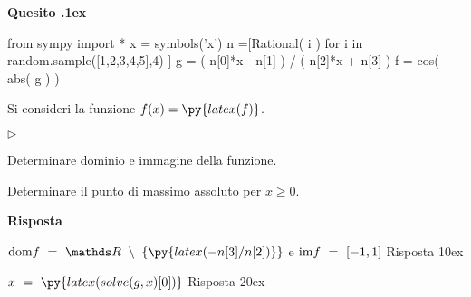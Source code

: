\documentclass[11pt,twoside,a4paper]{article}
\newcommand{\mylabel}[1]{#1\hfill}
\renewenvironment{itemize}
  {\begin{list}{$\triangleright$}{%
   \setlength{\parskip}{0mm}
   \setlength{\topsep}{.4\baselineskip}
   \setlength{\rightmargin}{0mm}
   \setlength{\listparindent}{0mm}
   \setlength{\itemindent}{0mm}
   \setlength{\labelwidth}{2ex}
   \setlength{\itemsep}{.4\baselineskip}
   \setlength{\parsep}{0mm}
   \setlength{\partopsep}{0mm}
   \setlength{\labelsep}{1ex}
   \setlength{\leftmargin}{\labelwidth+\labelsep}
   \let\makelabel\mylabel}}{%
   \end{list}\vspace*{-1.3mm}}
\newcounter{quesito}
\newenvironment{question}{\addtocounter{quesito}{1}\bigskip\bigskip\par\textbf{Quesito \thequesito.\kern1ex}}{\vspace{\parskip}}
\newenvironment{answer}{\par\textbf{Risposta\quad}}{\vspace{\parskip}}
\begin{document}
\begin{question}
\def\RR{{\mathds R}}
\def\dom{{\rm dom}}
\def\range{{\rm im}}
\begin{pycode}
from sympy import *
x = symbols('x')
n =[Rational( i ) for i in random.sample([1,2,3,4,5],4) ]
g = ( n[0]*x - n[1] ) / ( n[2]*x + n[3] )
f = cos( abs( g ) )
\end{pycode}
Si consideri la funzione $\displaystyle f(x) = \py{latex(f)}$.
\begin{itemize}
\item[1.] Determinare dominio e immagine della funzione.
\item[2.] Determinare il punto di massimo assoluto per $x \geq 0$.
\end{itemize}
\begin{answer}

{\color{blue}
$\displaystyle \dom f \ =\ \RR\ \setminus\ \left\{\py{latex(-n[3]/n[2])}\right\} $
\quad e\quad 
$\range f \ =\ [-1, 1]$ 
\hfill Risposta 1\kern0ex}

{\color{blue}
$\displaystyle x\ =\ \py{latex(solve(g,x)[0])}$
\hfill Risposta 2\kern0ex}

\end{answer}
\end{question}
\end{document}

